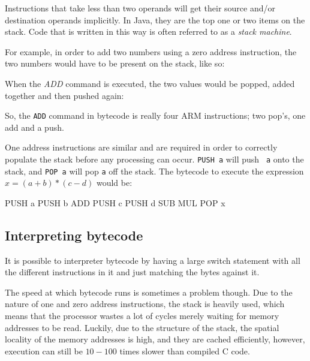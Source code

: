 Instructions that take less than two operands will get their source and/or
destination operands implicitly. In Java, they are the top one or two items on
the stack. Code that is written in this way is often referred to as a {\it stack
machine}.

For example, in order to add two numbers using a zero address instruction, the
two numbers would have to be present on the stack, like so:

\begin{center}
\begin{drawstack}
		
\end{drawstack}
\end{center}

When the {\it ADD} command is executed, the two values would be popped, added
together and then pushed again:

\begin{center}
\begin{drawstack}
		
\end{drawstack}
\end{center}

So, the {\tt ADD} command in bytecode is really four ARM instructions; two
pop's, one add and a push.

One address instructions are similar and are required in order to correctly
populate the stack before any processing can occur. {\tt PUSH a} will push {\tt
a} onto the stack, and {\tt POP a} will pop {\tt a} off the stack. The bytecode
to execute the expression $x = (a+b) * (c-d)$ would be:

\begin{listing}{1}
	PUSH a
	PUSH b
	ADD
	PUSH c
	PUSH d
	SUB
	MUL
	POP x
\end{listing}

\subsection{Interpreting bytecode}

It is possible to interpreter bytecode by having a large switch statement with
all the different instructions in it and just matching the bytes against it.

The speed at which bytecode runs is sometimes a problem though. Due to the
nature of one and zero address instructions, the stack is heavily used, which
means that the processor wastes a lot of cycles merely waiting for memory
addresses to be read. Luckily, due to the structure of the stack, the spatial
locality of the memory addresses is high, and they are cached efficiently,
however, execution can still be $10-100$ times slower than compiled C code.

